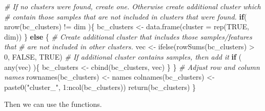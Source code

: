 \documentclass[
  oneside]{book}
\newenvironment{Shaded}{\begin{snugshade}}{\end{snugshade}}
\newcommand{\AttributeTok}[1]{\textcolor[rgb]{0.77,0.63,0.00}{#1}}
\newcommand{\CommentTok}[1]{\textcolor[rgb]{0.56,0.35,0.01}{\textit{#1}}}
\newcommand{\ConstantTok}[1]{\textcolor[rgb]{0.00,0.00,0.00}{#1}}
\newcommand{\ControlFlowTok}[1]{\textcolor[rgb]{0.13,0.29,0.53}{\textbf{#1}}}
\newcommand{\DecValTok}[1]{\textcolor[rgb]{0.00,0.00,0.81}{#1}}
\newcommand{\FunctionTok}[1]{\textcolor[rgb]{0.00,0.00,0.00}{#1}}
\newcommand{\NormalTok}[1]{#1}
\newcommand{\OtherTok}[1]{\textcolor[rgb]{0.56,0.35,0.01}{#1}}
\newcommand{\SpecialCharTok}[1]{\textcolor[rgb]{0.00,0.00,0.00}{#1}}
\newcommand{\StringTok}[1]{\textcolor[rgb]{0.31,0.60,0.02}{#1}}
\begin{document}
\begin{Shaded}
\begin{Highlighting}[]
  \CommentTok{\# If no clusters were found, create one. Otherwise create additional cluster which}
  \CommentTok{\# contain those samples that are not included in clusters that were found.}
  \ControlFlowTok{if}\NormalTok{( }\FunctionTok{nrow}\NormalTok{(bc\_clusters) }\SpecialCharTok{!=}\NormalTok{ dim )\{}
\NormalTok{      bc\_clusters }\OtherTok{\textless{}{-}} \FunctionTok{data.frame}\NormalTok{(}\AttributeTok{cluster =} \FunctionTok{rep}\NormalTok{(}\ConstantTok{TRUE}\NormalTok{, dim))}
\NormalTok{  \} }\ControlFlowTok{else}\NormalTok{ \{}
      \CommentTok{\# Create additional cluster that includes those samples/features that}
      \CommentTok{\# are not included in other clusters.}
\NormalTok{      vec }\OtherTok{\textless{}{-}} \FunctionTok{ifelse}\NormalTok{(}\FunctionTok{rowSums}\NormalTok{(bc\_clusters) }\SpecialCharTok{\textgreater{}} \DecValTok{0}\NormalTok{, }\ConstantTok{FALSE}\NormalTok{, }\ConstantTok{TRUE}\NormalTok{)}
      \CommentTok{\# If additional cluster contains samples, then add it}
      \ControlFlowTok{if}\NormalTok{ ( }\FunctionTok{any}\NormalTok{(vec) )\{}
\NormalTok{          bc\_clusters }\OtherTok{\textless{}{-}} \FunctionTok{cbind}\NormalTok{(bc\_clusters, vec)}
\NormalTok{      \}}
\NormalTok{  \}}
  \CommentTok{\# Adjust row and column names}
  \FunctionTok{rownames}\NormalTok{(bc\_clusters) }\OtherTok{\textless{}{-}}\NormalTok{ names}
  \FunctionTok{colnames}\NormalTok{(bc\_clusters) }\OtherTok{\textless{}{-}} \FunctionTok{paste0}\NormalTok{(}\StringTok{"cluster\_"}\NormalTok{, }\DecValTok{1}\SpecialCharTok{:}\FunctionTok{ncol}\NormalTok{(bc\_clusters))}
  \FunctionTok{return}\NormalTok{(bc\_clusters)}
\NormalTok{\}}
\end{Highlighting}
\end{Shaded}

Then we can use the functions.

\begin{Shaded}
\end{Shaded}
\end{document}
